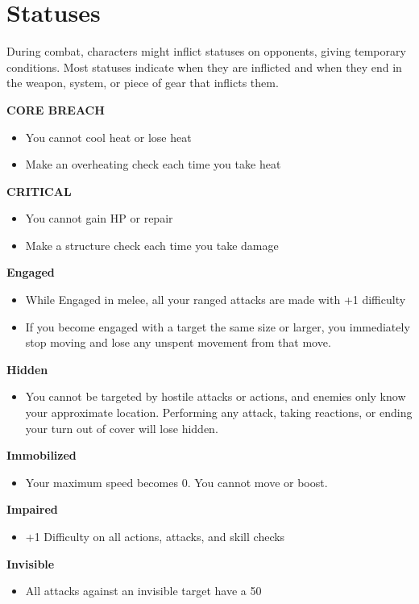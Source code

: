 \section{Statuses}
During combat, characters might inflict statuses on opponents, giving temporary conditions. Most statuses indicate when they are inflicted and when they end in the weapon, system, or piece of gear that inflicts them.

\textbf{CORE BREACH}
\begin{itemize}
	\item You cannot cool heat or lose heat
	\item Make an overheating check each time you take heat
\end{itemize}

\textbf{CRITICAL}
\begin{itemize}
	\item You cannot gain HP or repair
	\item Make a structure check each time you take damage
\end{itemize}

\textbf{Engaged}
\begin{itemize}
	\item While Engaged in melee, all your ranged attacks are made with +1 difficulty
	\item If you become engaged with a target the same size or larger, you immediately stop moving and lose any unspent movement from that move.
\end{itemize}

\textbf{Hidden}
\begin{itemize}
	\item You cannot be targeted by hostile attacks or actions, and enemies only know your approximate location. Performing any attack, taking reactions, or ending your turn out of cover will lose hidden.
\end{itemize}

\textbf{Immobilized}
\begin{itemize}
	\item Your maximum speed becomes 0. You cannot move or boost.
\end{itemize}

\textbf{Impaired}
\begin{itemize}
	\item +1 Difficulty on all actions, attacks, and skill checks
\end{itemize}

\textbf{Invisible}
\begin{itemize}
	\item All attacks against an invisible target have a 50%
\end{itemize}

